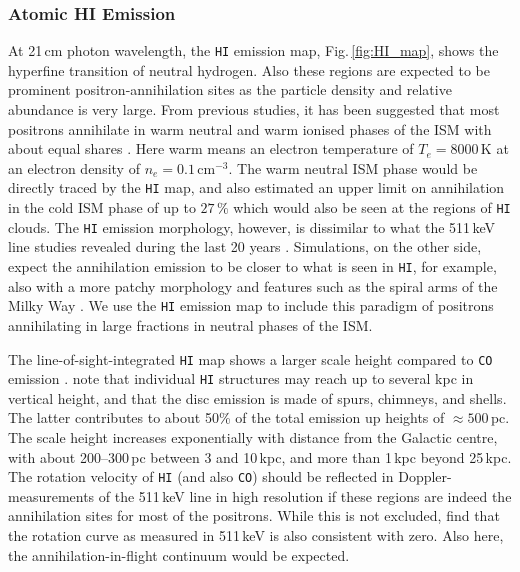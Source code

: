 \documentclass[doublespace,nopageskip]{VTthesis} %
\newcommand{\mrm}[1]{\mathrm{#1}}
\begin{document}
\subsubsection{Atomic HI Emission}

At 21\,cm photon wavelength, the \texttt{HI} emission map, Fig.\,\ref{fig:HI_map}, shows the hyperfine transition of neutral hydrogen.
%
Also these regions are expected to be prominent positron-annihilation sites as the particle density and relative abundance is very large.
%
From previous studies, it has been suggested that most positrons annihilate in warm neutral and warm ionised phases of the ISM with about equal shares \citep{2006A&A...445..579J}.
%
Here warm means an electron temperature of $T_e = 8000\,\mrm{K}$ at an electron density of $n_e = 0.1\,\mrm{cm^{-3}}$.
%
The warm neutral ISM phase would be directly traced by the \texttt{HI} map, and \citet{2006A&A...445..579J} also estimated an upper limit on annihilation in the cold ISM phase of up to $27\,\%$ which would also be seen at the regions of \texttt{HI} clouds.
%
The \texttt{HI} emission morphology, however, is dissimilar to what the 511\,keV line studies revealed during the last 20 years \citep{1997ApJ...491..725P,2005A&A...441..513K,2016A&A...586A..84S,2019A&A...627A.126S,Skinner2014_511,2011MNRAS.411.1727C}.
%
Simulations, on the other side, expect the annihilation emission to be closer to what is seen in \texttt{HI}, for example, also with a more patchy morphology and features such as the spiral arms of the Milky Way \citep{2014A&A...564A.108A,2018Galax...6...39P}.
%
We use the \texttt{HI} emission map to include this paradigm of positrons annihilating in large fractions in neutral phases of the ISM. 

The line-of-sight-integrated \texttt{HI} map shows a larger scale height compared to \texttt{CO} emission \citep{1990ARA&A..28..215D}.
%
\citet{2009ARA&A..47...27K} note that individual \texttt{HI} structures may reach up to several kpc in vertical height, and that the disc emission is made of spurs, chimneys, and shells.
%
The latter contributes to about 50\% of the total emission up heights of $\approx 500$\,pc.
%
The scale height increases exponentially with distance from the Galactic centre, with about 200--300\,pc between 3 and 10\,kpc, and more than 1\,kpc beyond 25\,kpc.
%
The rotation velocity of \texttt{HI} (and also \texttt{CO}) should be reflected in Doppler-measurements of the 511\,keV line in high resolution if these regions are indeed the annihilation sites for most of the positrons.
%
While this is not excluded, \citet{2019A&A...627A.126S} find that the rotation curve as measured in 511\,keV is also consistent with zero.
%
Also here, the annihilation-in-flight continuum would be expected.
\end{document}
